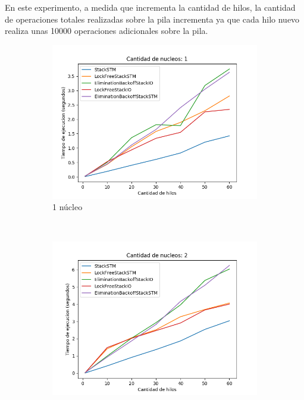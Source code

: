 En este experimento, a medida que incrementa la cantidad de hilos, la cantidad de operaciones totales realizadas sobre la pila incrementa ya que cada hilo nuevo realiza unas 10000 operaciones adicionales sobre la pila.

\begin{figure}[!h]
    \centering
    \begin{subfigure}[b]{0.49\textwidth}
        \includegraphics[width=\textwidth]{images/numberOfThreads/plots/1.png}
        \caption{1 núcleo}
        \label{subfig:numberOfThreads-1core}
    \end{subfigure}
    ~
    \begin{subfigure}[b]{0.49\textwidth}
        \includegraphics[width=\textwidth]{images/numberOfThreads/plots/2.png}

\end{subfigure}
\end{figure}
